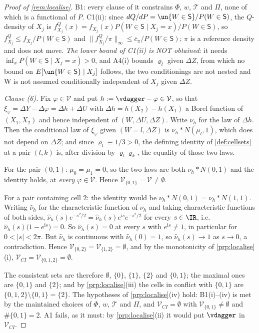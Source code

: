 \begin{proof}[Proof of \cref{rem:localise}]
B1: every clause of it constrains $\Phi$, $w$, $\mathcal T$ and $\Pi$, none
of which is a functional of $P$. C1(ii): since $dQ/dP=\un\{W\in\mathsf S\}/P(W\in\mathsf S)$, the
$Q$-density of $X_j$ is $f^{Q}_{X_j}(x)=f_{X_j}(x)P(W\in\mathsf S\mid X_j=x)/P(W\in\mathsf S)$, so
$f^{Q}_{X_j}\le f_{X_j}/P(W\in\mathsf S)$ and
$\|f^{Q}_{X_j}/\pi\|_\infty\le\bar c_\pi/P(W\in\mathsf S)$; $\pi$ is a reference density and does not
move. \emph{The lower bound of C1(ii) is NOT obtained}: it needs
$\inf_xP(W\in\mathsf S\mid X_j=x)>0$, and A4(i) bounds $\varrho_l$ given $\Delta Z$, from which no
bound on $E[\un\{W\in\mathsf S\}\mid X_j]$ follows, the two conditionings are not nested and W is
not assumed conditionally independent of $X_j$ given $\Delta Z$.

\emph{Clause \textup{(6)}.} Fix $\varphi\in\mathcal V$ and put $h:=\vdagger-\varphi\in\mathcal V$, so
that $\xi_\varphi=\Delta Y-\Delta\varphi=\Delta h+\Delta U$ with
$\Delta h=h(X_2)-h(X_1)$ a Borel function of $(X_1,X_2)$ and hence independent of
$(W,\Delta U,\Delta Z)$. Write $\nu_h$ for the law of $\Delta h$. Then the conditional law of
$\xi_\varphi$ given $(W=l,\Delta Z)$ is $\nu_h\ast N(\mu_l,1)$, which does not depend on $\Delta Z$;
and since $\varrho_l\equiv1/3>0$, the defining identity of \cref{def:cellsets} at a pair $(l,k)$ is,
after division by $\varrho_l\varrho_k$, the equality of those two laws.

For the pair $(0,1)$: $\mu_0=\mu_1=0$, so the two laws are both $\nu_h\ast N(0,1)$ and the identity
holds, at \emph{every} $\varphi\in\mathcal V$. Hence $\mathcal V_{\{0,1\}}=\mathcal V\neq\emptyset$.

For a pair containing cell $2$: the identity would be $\nu_h\ast N(0,1)=\nu_h\ast N(1,1)$. Writing
$\hat\nu_h$ for the characteristic function of $\nu_h$ and taking characteristic functions of both
sides, $\hat\nu_h(s)e^{-s^{2}/2}=\hat\nu_h(s)e^{\mathrm is}e^{-s^{2}/2}$ for every $s\in\IR$, i.e.
$\hat\nu_h(s)\big(1-e^{\mathrm is}\big)=0$. So $\hat\nu_h(s)=0$ at every $s$ with
$e^{\mathrm is}\neq1$, in particular for $0<|s|<2\pi$. But $\hat\nu_h$ is continuous with
$\hat\nu_h(0)=1$, so $\hat\nu_h(s)\to1$ as $s\to0$, a contradiction. Hence
$\mathcal V_{\{0,2\}}=\mathcal V_{\{1,2\}}=\emptyset$, and by the monotonicity of
\cref{prp:localise}\textup{(i)}, $\mathcal V_{CI}=\mathcal V_{\{0,1,2\}}=\emptyset$.

The consistent sets are therefore $\emptyset$, $\{0\}$, $\{1\}$, $\{2\}$ and $\{0,1\}$; the maximal
ones are $\{0,1\}$ and $\{2\}$; and by \cref{prp:localise}\textup{(iii)} the cells in conflict with
$\{0,1\}$ are $\{0,1,2\}\setminus\{0,1\}=\{2\}$. The hypotheses of
\cref{prp:localise}\textup{(iv)} hold: B1(i)--(iv) is met by the maintained choices of $\Phi$, $w$,
$\mathcal T$ and $\Pi$, and $\mathcal V_{CI}=\emptyset$ with
$\mathcal V_{\{0,1\}}\neq\emptyset$ and $\#\{0,1\}=2$. A1 fails, as it must: by
\cref{prp:localise}\textup{(ii)} it would put $\vdagger$ in $\mathcal V_{CI}$.


\end{proof}
